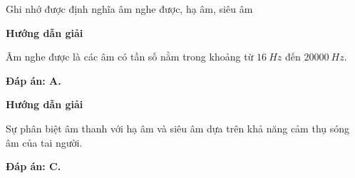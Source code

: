 \begin{dang}{Ghi nhớ được định nghĩa âm nghe được, hạ âm, siêu âm}
	{\begin{center}
			\textbf{Hướng dẫn giải}
		\end{center}
		
		Âm nghe được là các âm có tần số nằm trong khoảng từ $\SI{16}{Hz}$ đến $\SI{20000}{Hz}$.
		
		\textbf{Đáp án: A.}
		
	}
	{\begin{center}
			\textbf{Hướng dẫn giải}
		\end{center}
		
		Sự phân biệt âm thanh với hạ âm và siêu âm dựa trên khả năng cảm thụ sóng âm của tai người.
		
		\textbf{Đáp án: C.}
		
	}
\end{dang}
